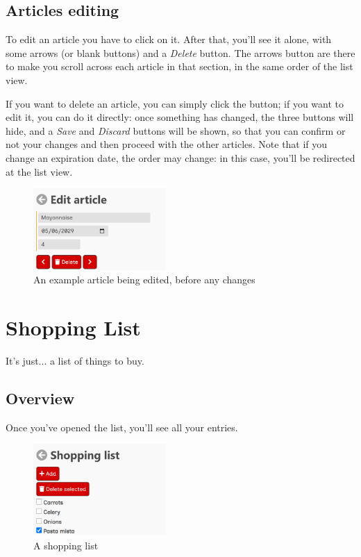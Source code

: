 \documentclass[12pt, a4paper]{report}
\begin{document}
    \section{Articles editing}

    To edit an article you have to click on it. After that, you'll see it alone, with some arrows (or blank buttons) and a \emph{Delete} button.
    The arrows button are there to make you scroll across each article in that section, in the same order of the list view.

    If you want to delete an article, you can simply click the button; if you want to edit it, you can do it directly: once something has changed,
    the three buttons will hide, and a \emph{Save} and \emph{Discard} buttons will be shown, so that you can confirm or not your changes and then
    proceed with the other articles.
    Note that if you change an expiration date, the order may change: in this case, you'll be redirected at the list view.

    \begin{figure}[H]
        \centering
        \includegraphics[width=0.45\textwidth]{assets/en/article.png}
        \caption{An example article being edited, before any changes}
    \end{figure}



    \chapter{Shopping List}

    It's just... a list of things to buy.

    \section{Overview}

    Once you've opened the list, you'll see all your entries.

    \begin{figure}[H]
        \centering
        \includegraphics[width=0.45\textwidth]{assets/en/shopping_list.png}
        \caption{A shopping list}
    \end{figure}
\end{document}
